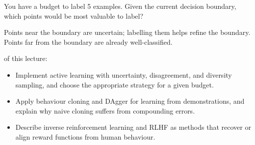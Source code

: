 \begin{marginfigure}
\caption{Active learning: query points near the decision boundary, where uncertainty is highest.}
\label{fig:active_learning_intro}
\end{marginfigure}

You have a budget to label 5 examples. Given the current decision boundary, which points would be most valuable to label?

Points near the boundary are uncertain; labelling them helps refine the boundary. Points far from the boundary are already well-classified.

 of this lecture:
\begin{itemize}
    \item Implement active learning with uncertainty, disagreement, and diversity sampling, and choose the appropriate strategy for a given budget.
    \item Apply behaviour cloning and DAgger for learning from demonstrations, and explain why naive cloning suffers from compounding errors.
    \item Describe inverse reinforcement learning and RLHF as methods that recover or align reward functions from human behaviour.
\end{itemize}


